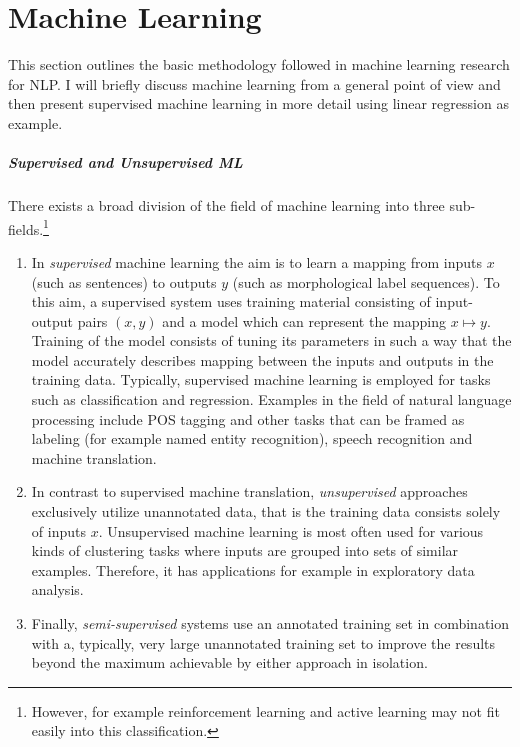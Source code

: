 \chapter{Machine Learning}
\label{chap:ml}

This section outlines the basic methodology followed in machine
learning research for NLP. I will briefly
discuss machine learning from a general point of view and then present
supervised machine learning in more detail using linear regression as
example.

\paragraph{Supervised and Unsupervised ML} There exists a broad
division of the field of machine learning into three sub-fields.\footnote{However, for example reinforcement learning and active learning may not fit easily into this classification.}
\begin{enumerate}
\item In {\it supervised} machine learning the aim is to learn a mapping
  from inputs $x$ (such as sentences) to outputs $y$ (such as
  morphological label sequences). To this aim, a supervised system
  uses training material consisting of input-output pairs $(x,y)$ and
  a model which can represent the mapping $x \mapsto y$. Training of
  the model consists of tuning its parameters in such a way that the
  model accurately describes mapping between the inputs and outputs in
  the training data. Typically, supervised machine learning is
  employed for tasks such as classification and regression. Examples
  in the field of natural language processing include POS tagging and
  other tasks that can be framed as labeling (for example named entity
  recognition), speech recognition and machine translation.
\item In contrast to supervised machine translation, {\it unsupervised}
  approaches exclusively utilize unannotated data, that is the
  training data consists solely of inputs $x$. Unsupervised machine
  learning is most often used for various kinds of clustering tasks
  where inputs are grouped into sets of similar examples. Therefore,
  it has applications for example in exploratory data analysis.
\item Finally, {\it semi-supervised}
  systems use an annotated training set in combination with a,
  typically, very large unannotated training set to improve the
  results beyond the maximum achievable by either approach in
  isolation.
\end{enumerate}

